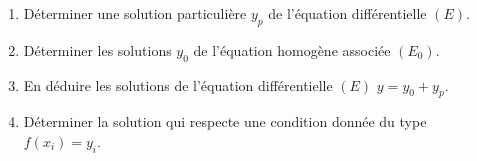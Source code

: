 \begin{methode}{}
\begin{enumerate}
	\item Déterminer une solution particulière $y_p$ de l'équation différentielle $(E)$.
	\item Déterminer les solutions $y_0$ de l'équation homogène associée $(E_0)$.
	\item En déduire les solutions de l'équation différentielle $(E)$ $y=y_0+y_p$.
	\item Déterminer la solution qui respecte une condition donnée du type $f(x_i)=y_i$.
\end{enumerate}

\end{methode}

\medskip

